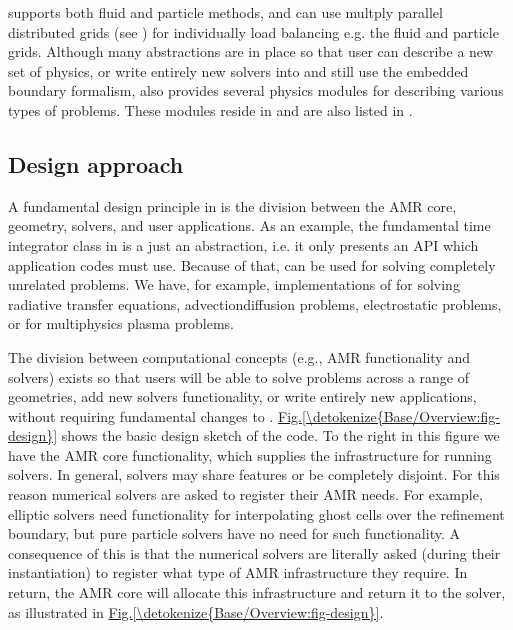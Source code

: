\documentclass[letterpaper,10pt,english]{sphinxmanual}
\begin{document}
 supports both fluid and particle methods, and can use multply parallel distributed grids (see {\hyperref[\detokenize{Source/Realm:chap-realm}]{}}) for individually load balancing e.g. the fluid and particle grids.
Although many abstractions are in place so that user can describe a new set of physics, or write entirely new solvers into  and still use the embedded boundary formalism,  also provides several physics modules for describing various types of problems.
These modules reside in  and are also listed in {\hyperref[\detokenize{Applications/ImplementedModels:chap-implementedmodels}]{}}.


\subsection{Design approach}
\label{\detokenize{Base/Overview:design-approach}}
A fundamental design principle in  is the division between the AMR core, geometry, solvers, and user applications.
As an example, the fundamental time integrator class  in  is a just an abstraction, i.e. it only presents an API which application codes must use.
Because of that,  can be used for solving completely unrelated problems.
We have, for example, implementations of  for solving radiative transfer equations, advection\sphinxhyphen{}diffusion problems, electrostatic problems, or for multiphysics plasma problems.

The division between computational concepts (e.g., AMR functionality and solvers) exists so that users will be able to solve problems across a range of geometries, add new solvers functionality, or write entirely new applications, without requiring fundamental changes to .
\hyperref[\detokenize{Base/Overview:fig-design}]{Fig.\@ \ref{\detokenize{Base/Overview:fig-design}}} shows the basic design sketch of the  code.
To the right in this figure we have the AMR core functionality, which supplies the infrastructure for running solvers.
In general, solvers may share features or be completely disjoint.
For this reason numerical solvers are asked to register their AMR needs.
For example, elliptic solvers need functionality for interpolating ghost cells over the refinement boundary, but pure particle solvers have no need for such functionality.
A consequence of this is that the numerical solvers are literally asked (during their instantiation) to register what type of AMR infrastructure they require.
In return, the AMR core will allocate this infrastructure and return it to the solver, as illustrated in \hyperref[\detokenize{Base/Overview:fig-design}]{Fig.\@ \ref{\detokenize{Base/Overview:fig-design}}}.
\end{document}
